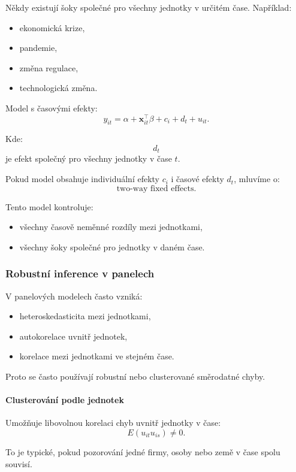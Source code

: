 Někdy existují šoky společné pro všechny jednotky v určitém čase. Například:
\begin{itemize}
    \item ekonomická krize,
    \item pandemie,
    \item změna regulace,
    \item technologická změna.
\end{itemize}

Model s časovými efekty:
\[
    y_{it}
    =
    \alpha
    +
    \mathbf x_{it}^\top\beta
    +
    c_i
    +
    d_t
    +
    u_{it}.
\]

Kde:
\[
    d_t
\]
je efekt společný pro všechny jednotky v čase $t$.

Pokud model obsahuje individuální efekty $c_i$ i časové efekty $d_t$, mluvíme o:
\[
    \text{two-way fixed effects}.
\]

Tento model kontroluje:
\begin{itemize}
    \item všechny časově neměnné rozdíly mezi jednotkami,
    \item všechny šoky společné pro jednotky v daném čase.
\end{itemize}

\subsubsection{Robustní inference v panelech}

V panelových modelech často vzniká:
\begin{itemize}
    \item heteroskedasticita mezi jednotkami,
    \item autokorelace uvnitř jednotek,
    \item korelace mezi jednotkami ve stejném čase.
\end{itemize}

Proto se často používají robustní nebo clusterované směrodatné chyby.

\paragraph{Clusterování podle jednotek}

Umožňuje libovolnou korelaci chyb uvnitř jednotky v čase:
\[
    E(u_{it}u_{is})\neq 0.
\]

To je typické, pokud pozorování jedné firmy, osoby nebo země v čase spolu souvisí.

